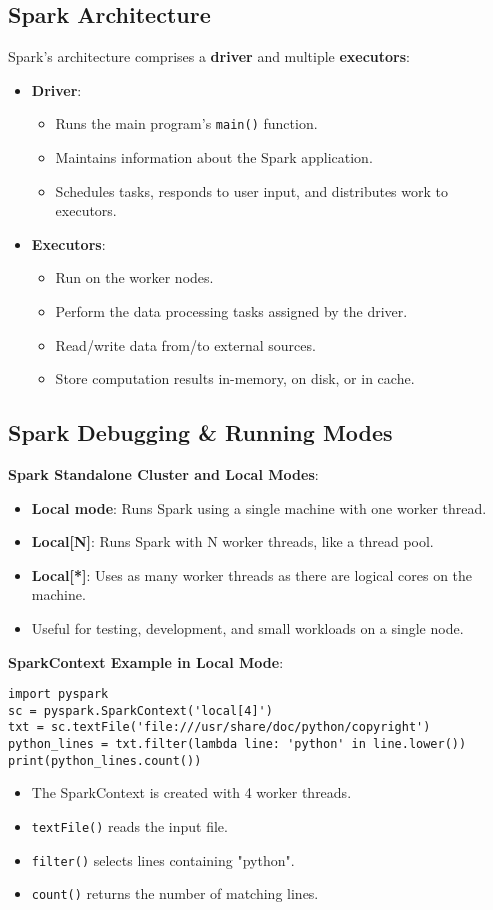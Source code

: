 \documentclass[12pt]{article}
\begin{document}
\subsection{Spark Architecture}
Spark’s architecture comprises a \textbf{driver} and multiple \textbf{executors}:

\begin{itemize}
    \item \textbf{Driver}:
    \begin{itemize}
        \item Runs the main program’s \texttt{main()} function.
        \item Maintains information about the Spark application.
        \item Schedules tasks, responds to user input, and distributes work to executors.
    \end{itemize}

    \item \textbf{Executors}:
    \begin{itemize}
        \item Run on the worker nodes.
        \item Perform the data processing tasks assigned by the driver.
        \item Read/write data from/to external sources.
        \item Store computation results in-memory, on disk, or in cache.
    \end{itemize}
\end{itemize}


\subsection{Spark Debugging \& Running Modes}
\textbf{Spark Standalone Cluster and Local Modes}:
\begin{itemize}
    \item \textbf{Local mode}: Runs Spark using a single machine with one worker thread.
    \item \textbf{Local[N]}: Runs Spark with N worker threads, like a thread pool.
    \item \textbf{Local[*]}: Uses as many worker threads as there are logical cores on the machine.
    \item Useful for testing, development, and small workloads on a single node.
\end{itemize}

\noindent\textbf{SparkContext Example in Local Mode}:
\begin{verbatim}
import pyspark
sc = pyspark.SparkContext('local[4]')
txt = sc.textFile('file:///usr/share/doc/python/copyright')
python_lines = txt.filter(lambda line: 'python' in line.lower())
print(python_lines.count())
\end{verbatim}

\begin{itemize}
    \item The SparkContext is created with 4 worker threads.
    \item \texttt{textFile()} reads the input file.
    \item \texttt{filter()} selects lines containing "python".
    \item \texttt{count()} returns the number of matching lines.
\end{itemize}
\end{document}
